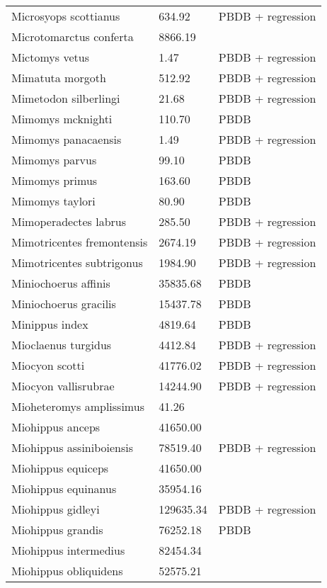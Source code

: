 \documentclass{article}
\begin{document}
\begin{center}
\begin{longtable}{p{} p{} p{}}
    Microsyops scottianus & 634.92 & PBDB + regression \\ 
    Microtomarctus conferta & 8866.19 & \cite{Tomiya2013} \\ 
    Mictomys vetus & 1.47 & PBDB + regression \\ 
    Mimatuta morgoth & 512.92 & PBDB + regression \\ 
    Mimetodon silberlingi & 21.68 & PBDB + regression \\ 
    Mimomys mcknighti & 110.70 & PBDB \\ 
    Mimomys panacaensis & 1.49 & PBDB + regression \\ 
    Mimomys parvus & 99.10 & PBDB \\ 
    Mimomys primus & 163.60 & PBDB \\ 
    Mimomys taylori & 80.90 & PBDB \\ 
    Mimoperadectes labrus & 285.50 & PBDB + regression \\ 
    Mimotricentes fremontensis & 2674.19 & PBDB + regression \\ 
    Mimotricentes subtrigonus & 1984.90 & PBDB + regression \\ 
    Miniochoerus affinis & 35835.68 & PBDB \\ 
    Miniochoerus gracilis & 15437.78 & PBDB \\ 
    Minippus index & 4819.64 & PBDB \\ 
    Mioclaenus turgidus & 4412.84 & PBDB + regression \\ 
    Miocyon scotti & 41776.02 & PBDB + regression \\ 
    Miocyon vallisrubrae & 14244.90 & PBDB + regression \\ 
    Mioheteromys amplissimus & 41.26 & \cite{Tomiya2013} \\ 
    Miohippus anceps & 41650.00 & \cite{McKenna2011} \\ 
    Miohippus assiniboiensis & 78519.40 & PBDB + regression \\ 
    Miohippus equiceps & 41650.00 & \cite{McKenna2011} \\ 
    Miohippus equinanus & 35954.16 & \cite{Tomiya2013} \\ 
    Miohippus gidleyi & 129635.34 & PBDB + regression \\ 
    Miohippus grandis & 76252.18 & PBDB \\ 
    Miohippus intermedius & 82454.34 & \cite{Tomiya2013} \\ 
    Miohippus obliquidens & 52575.21 & \cite{Tomiya2013} \\ 

\end{longtable}
\end{center}
\end{document}
